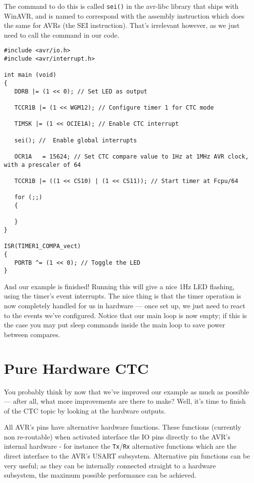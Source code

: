 \documentclass[a4paper,oneside]{book}
\begin{document}
The command to do this is called \texttt{sei()} in the avr-libc library that ships with WinAVR, and is named to correspond with the assembly instruction which does the same for AVRs (the SEI instruction). That's irrelevant however, as we just need to call the command in our code. 

\begin{center}
\begin{lstlisting}
#include <avr/io.h>
#include <avr/interrupt.h>

int main (void)
{
   DDRB |= (1 << 0); // Set LED as output

   TCCR1B |= (1 << WGM12); // Configure timer 1 for CTC mode

   TIMSK |= (1 << OCIE1A); // Enable CTC interrupt

   sei(); //  Enable global interrupts

   OCR1A   = 15624; // Set CTC compare value to 1Hz at 1MHz AVR clock, with a prescaler of 64

   TCCR1B |= ((1 << CS10) | (1 << CS11)); // Start timer at Fcpu/64

   for (;;)
   {

   }
}

ISR(TIMER1_COMPA_vect)
{
   PORTB ^= (1 << 0); // Toggle the LED
} 
\end{lstlisting}
\end{center}

And our example is finished! Running this will give a nice 1Hz LED flashing, using the timer's event interrupts. The nice thing is that the timer operation is now completely handled for us in hardware --- once set up, we just need to react to the events we've configured. Notice that our main loop is now empty; if this is the case you may put sleep commands inside the main loop to save power between compares. 


\label{chp:HWCTC}
\chapter{Pure Hardware CTC}

You probably think by now that we've improved our example as much as possible --- after all, what more improvements are there to make? Well, it's time to finish of the CTC topic by looking at the hardware outputs.

All AVR's pins have alternative hardware functions. These functions (currently non re-routable) when activated interface the IO pins directly to the AVR's internal hardware - for instance the \texttt{Tx}/\texttt{Rx} alternative functions which are the direct interface to the AVR's USART subsystem. Alternative pin functions can be very useful; as they can be internally connected straight to a hardware subsystem, the maximum possible performance can be achieved.
\end{document}
